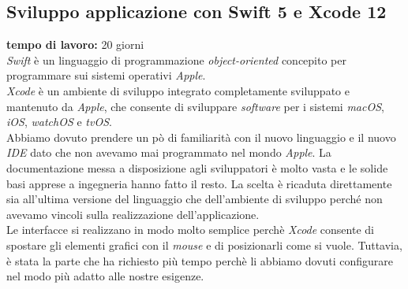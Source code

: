 \subsection{Sviluppo applicazione con Swift 5 e Xcode 12}
\textbf{tempo di lavoro:} 20 giorni\\
\newline
\textit{Swift} è un linguaggio di programmazione \textit{object-oriented} concepito per programmare sui sistemi operativi \textit{Apple}.\\
\newline
\textit{Xcode} è un ambiente di sviluppo integrato completamente sviluppato e mantenuto da \textit{Apple}, che consente di sviluppare \textit{software} per i sistemi \textit{macOS}, \textit{iOS}, \textit{watchOS} e \textit{tvOS}.\\
\newline
Abbiamo dovuto prendere un pò di familiarità con il nuovo linguaggio e il nuovo \textit{IDE} dato che non avevamo mai programmato nel mondo \textit{Apple}. La documentazione messa a disposizione agli sviluppatori è molto vasta e le solide basi apprese a ingegneria hanno fatto il resto.
La scelta è ricaduta direttamente sia all'ultima versione del linguaggio che dell'ambiente di sviluppo perché non avevamo vincoli sulla realizzazione dell'applicazione.\\
\newline
Le interfacce si realizzano in modo molto semplice perchè \textit{Xcode} consente di spostare gli elementi grafici con il \textit{mouse} e di posizionarli come si vuole. Tuttavia, è stata la parte che ha richiesto più tempo perchè li abbiamo dovuti configurare nel modo più adatto alle nostre esigenze. 
